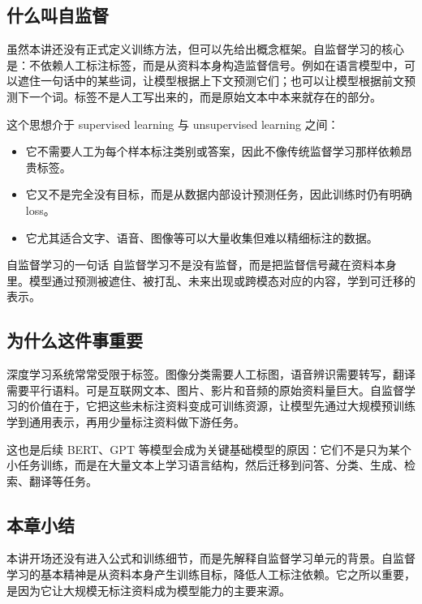 \documentclass[a4paper]{article}
\begin{document}
\subsection{什么叫自监督}

虽然本讲还没有正式定义训练方法，但可以先给出概念框架。自监督学习的核心是：不依赖人工标注标签，而是从资料本身构造监督信号。例如在语言模型中，可以遮住一句话中的某些词，让模型根据上下文预测它们；也可以让模型根据前文预测下一个词。标签不是人工写出来的，而是原始文本中本来就存在的部分。

这个思想介于 supervised learning 与 unsupervised learning 之间：

\begin{itemize}
    \item 它不需要人工为每个样本标注类别或答案，因此不像传统监督学习那样依赖昂贵标签。
    \item 它又不是完全没有目标，而是从数据内部设计预测任务，因此训练时仍有明确 loss。
    \item 它尤其适合文字、语音、图像等可以大量收集但难以精细标注的数据。
\end{itemize}

\begin{importantbox}{自监督学习的一句话}
    自监督学习不是没有监督，而是把监督信号藏在资料本身里。模型通过预测被遮住、被打乱、未来出现或跨模态对应的内容，学到可迁移的表示。
\end{importantbox}

\subsection{为什么这件事重要}

深度学习系统常常受限于标签。图像分类需要人工标图，语音辨识需要转写，翻译需要平行语料。可是互联网文本、图片、影片和音频的原始资料量巨大。自监督学习的价值在于，它把这些未标注资料变成可训练资源，让模型先通过大规模预训练学到通用表示，再用少量标注资料做下游任务。

这也是后续 BERT、GPT 等模型会成为关键基础模型的原因：它们不是只为某个小任务训练，而是在大量文本上学习语言结构，然后迁移到问答、分类、生成、检索、翻译等任务。

\subsection{本章小结}

本讲开场还没有进入公式和训练细节，而是先解释自监督学习单元的背景。自监督学习的基本精神是从资料本身产生训练目标，降低人工标注依赖。它之所以重要，是因为它让大规模无标注资料成为模型能力的主要来源。
\end{document}
